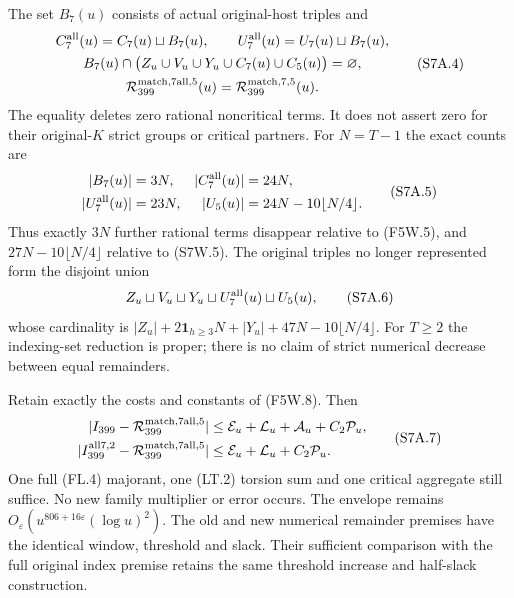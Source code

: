 \begin{theorem}
\label{AC-G202-window}
The set $B_7(u)$ consists of actual original-host triples and
\[
 \begin{gathered}
 C_7^{\rm all}(u)=C_7(u)\sqcup B_7(u),\qquad
 U_7^{\rm all}(u)=U_7(u)\sqcup B_7(u),\\
 B_7(u)\cap\bigl(Z_u\cup V_u\cup Y_u\cup C_7(u)\cup C_5(u)\bigr)
                      =\varnothing,\\
 \mathcal R_{399}^{\rm match,7all,5}(u)
                        =\mathcal R_{399}^{\rm match,7,5}(u).
 \end{gathered}\tag{S7A.4}
\]
The equality deletes zero rational noncritical terms. It does not
assert zero for their original-$K$ strict groups or critical partners.
For $N=T-1$ the exact counts are
\[
 \begin{aligned}
 |B_7(u)|&=3N,& |C_7^{\rm all}(u)|&=24N,\\
 |U_7^{\rm all}(u)|&=23N,& |U_5(u)|&=24N-10\lfloor N/4\rfloor.
 \end{aligned}\tag{S7A.5}
\]
Thus exactly $3N$ further rational terms disappear relative to
(F5W.5), and $27N-10\lfloor N/4\rfloor$ relative to (S7W.5).
The original triples no longer represented form the disjoint union
\[
 Z_u\sqcup V_u\sqcup Y_u\sqcup U_7^{\rm all}(u)\sqcup U_5(u),
 \tag{S7A.6}
\]
whose cardinality is
$|Z_u|+2\mathbf1_{h\geq3}N+|Y_u|+47N-10\lfloor N/4\rfloor$.
For $T\geq2$ the indexing-set reduction is proper; there is no
claim of strict numerical decrease between equal remainders.

Retain exactly the costs and constants of (F5W.8). Then
\[
 \begin{aligned}
 |I_{399}-\mathcal R_{399}^{\rm match,7all,5}|&\leq
      \mathcal E_u+\mathcal L_u+\mathcal A_u+C_2\mathcal P_u,\\
 |I_{399}^{\rm all7,2}-\mathcal R_{399}^{\rm match,7all,5}|&\leq
      \mathcal E_u+\mathcal L_u+C_2\mathcal P_u.
 \end{aligned}\tag{S7A.7}
\]
One full (FL.4) majorant, one (LT.2) torsion sum and one critical
aggregate still suffice. No new family multiplier or error occurs.
The envelope remains
$O_\varepsilon(u^{806+16\varepsilon}(\log u)^2)$.
The old and new numerical remainder premises have the identical
window, threshold and slack. Their sufficient comparison with
the full original index premise retains the same threshold
increase and half-slack construction.
\end{theorem}


